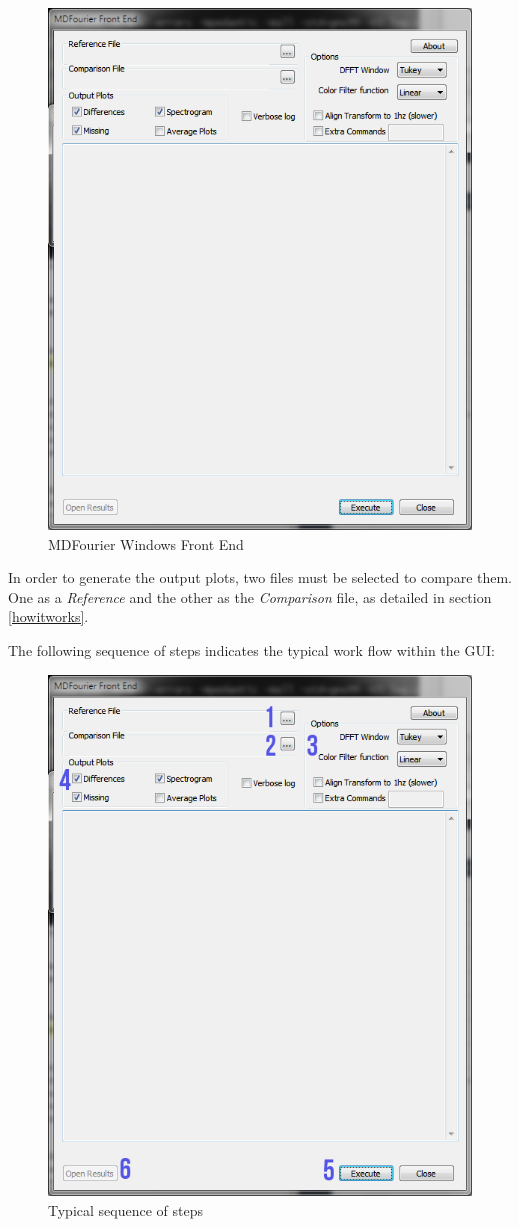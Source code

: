 \documentclass[10pt,a4paper]{report}
\begin{document}
\begin{figure}[H]
	\centering
	\includegraphics[width=0.6\linewidth]{images/GUI/GUI1.png}
	\caption[Front End]{MDFourier Windows Front End}
	\label{fig:gui1}
\end{figure}

In order to generate the output plots, two files must be selected to compare them. One as a \textit{Reference} and the other as the \textit{Comparison} file, as detailed in section \ref{howitworks}.

The following sequence of steps indicates the typical work flow within the GUI:

\begin{figure}[H]
	\centering
	\includegraphics[width=0.6\linewidth]{images/GUI/GUI2.png}
	\caption[Steps]{Typical sequence of steps}
	\label{fig:gui2}
\end{figure}
\end{document}
